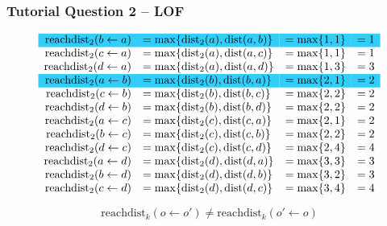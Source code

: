 \documentclass[aspectratio=169, 10pt]{beamer}
\begin{document}
\begin{frame}[t]
    \frametitle{Tutorial Question 2 -- LOF}
    \small

    \begin{equation*}
        \begin{array}{rlll}
            \rowcolor[HTML]{34CDF9} \text{reachdist}_2(b \leftarrow a) & = \max\{\text{dist}_2(a), \text{dist}(a, b)\} & = \max\{1, 1\} & = 1\\
            \text{reachdist}_2(c \leftarrow a) & = \max\{\text{dist}_2(a), \text{dist}(a, c)\} & = \max\{1, 1\} & = 1\\
            \text{reachdist}_2(d \leftarrow a) & = \max\{\text{dist}_2(a), \text{dist}(a, d)\} & = \max\{1, 3\} & = 3\\
            \rowcolor[HTML]{34CDF9} \text{reachdist}_2(a \leftarrow b) & = \max\{\text{dist}_2(b), \text{dist}(b, a)\} & = \max\{2, 1\} & = 2\\
            \text{reachdist}_2(c \leftarrow b) & = \max\{\text{dist}_2(b), \text{dist}(b, c)\} & = \max\{2, 2\} & = 2\\
            \text{reachdist}_2(d \leftarrow b) & = \max\{\text{dist}_2(b), \text{dist}(b, d)\} & = \max\{2, 2\} & = 2\\
            \text{reachdist}_2(a \leftarrow c) & = \max\{\text{dist}_2(c), \text{dist}(c, a)\} & = \max\{2, 1\} & = 2\\
            \text{reachdist}_2(b \leftarrow c) & = \max\{\text{dist}_2(c), \text{dist}(c, b)\} & = \max\{2, 2\} & = 2\\
            \text{reachdist}_2(d \leftarrow c) & = \max\{\text{dist}_2(c), \text{dist}(c, d)\} & = \max\{2, 4\} & = 4\\
            \text{reachdist}_2(a \leftarrow d) & = \max\{\text{dist}_2(d), \text{dist}(d, a)\} & = \max\{3, 3\} & = 3\\
            \text{reachdist}_2(b \leftarrow d) & = \max\{\text{dist}_2(d), \text{dist}(d, b)\} & = \max\{3, 2\} & = 3\\
            \text{reachdist}_2(c \leftarrow d) & = \max\{\text{dist}_2(d), \text{dist}(d, c)\} & = \max\{3, 4\} & = 4\\
        \end{array}
    \end{equation*}

    \[
        \text{reachdist}_k(o \leftarrow o') \neq \text{reachdist}_k(o' \leftarrow o)
    \]
\end{frame}
\end{document}
